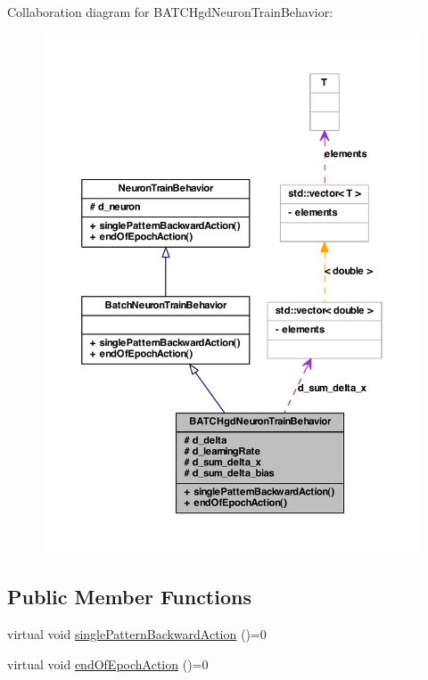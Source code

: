 Collaboration diagram for BATCHgdNeuronTrainBehavior:
\nopagebreak
\begin{figure}[H]
\begin{center}
\leavevmode
\includegraphics[width=381pt]{class_b_a_t_c_hgd_neuron_train_behavior__coll__graph}
\end{center}
\end{figure}
\subsection*{Public Member Functions}
\begin{DoxyCompactItemize}
\item 
virtual void \hyperlink{class_b_a_t_c_hgd_neuron_train_behavior_a718bebef530c49fd596c9b8fed0add47}{singlePatternBackwardAction} ()=0
\item 
virtual void \hyperlink{class_b_a_t_c_hgd_neuron_train_behavior_a889aa3bba7cef4fe324d8531bfa76644}{endOfEpochAction} ()=0
\end{DoxyCompactItemize}
